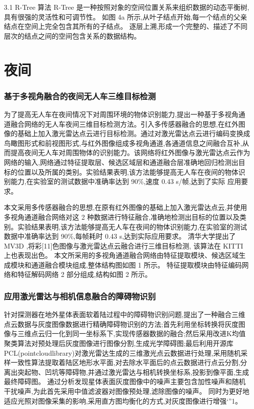 \message{ !name(\unexpanded{数据融合}.tex)}\documentclass{amsart}
\begin{document}
3.1 R-Tree 算法
R-Tree 是一种按照对象的空间位置关系来组织数据的动态平衡树,具有很强的灵活性和可调节性。
如图 4a 所示,从叶子结点开始,每一个结点的父亲结点在空间上完全包含其所有的子结点。
逐层上溯,形成一个完整的、描述了不同层次的结点之间的空间包含关系的数据结构。


\section{夜间}
\subsubsection{基于多视角融合的夜间无人车三维目标检测}
\cite{王宇岚}
为了提高无人车在夜间情况下对周围环境的物体识别能力,提出一种基于多视角通道融合网络的无人车夜间三维目标检测方法。引入多传感器融合的思想,在红外图像的基础上加入激光雷达点云进行目标检测。通过对激光雷达点云进行编码变换成鸟瞰图形式和前视图形式,与红外图像组成多视角通道,各通道信息之间融合互补,从而提高夜间无人车对周围物体的识别能力。该网络将红外图像与激光雷达点云作为网络的输入,网络通过特征提取层、候选区域层和通道融合层准确地回归检测出目标的位置以及所属的类别。实验结果表明,该方法能够提高无人车在夜间的物体识别能力,在实验室的测试数据中准确率达到 90\%,速度 0.43 s/帧,达到了实际
应用要求。


本文采用多传感器融合的思想,在原有红外图像的基础上加入激光雷达点云,并使用多视角通道融合网络对这 2 种数据进行特征融合,准确地检测出目标的位置以及类别。实验结果表明,该方法能够提高无人车在夜间的物体识别能力,在实验室的测试数据中准确率达到 90\%,每帧耗时 0.43 s,达到实际应用要求。
清华大学提出了 MV3D ,将彩[11]色图像与激光雷达点云融合进行三维目标检测,
该算法在 KITTI 上也表现出色。
本文所采用的多视角通道融合网络由特征提取模块、候选区域生成模块和通道融合模块组成,整体结构图如图 1 所示。
特征提取模块由特征编码网络和特征解码网络 2 部分组成,结构如图 2 所示。


\subsubsection{应用激光雷达与相机信息融合的障碍物识别}
针对探测器在地外星体表面软着陆过程中的障碍物识别问题,提出了一种融合三维点云数据与灰度图像数据进行精确障碍物识别的方法;首先利用坐标转换将灰度图像与三维点云归一化到同一坐标系下,实现传感器数据的融合;然后采用改进K均值聚类算法对预处理后灰度图像进行图像分割,生成光学障碍图;最后利用开源库PCL(pointcloudlibrary)对激光雷达生成的三维激光点云数据进行处理,采用随机采样一致性算法提取着陆区地形水平面,对去除水平面后的点云数据进行点云分割,分离出突起物、凹坑等障碍物,并通过激光雷达与相机转换坐标系,投影到像平面,生成最终障碍图。
通过分析发现星体表面灰度图像中的噪声主要包含加性噪声和随机干扰噪声,为此首先采用中值滤波器对图像预处理,滤除图像的噪声。
同时为更好地适应光照对图像采集的影响,采用直方图均衡化的方式,对灰度图像进行增强‘”1。
\end{document}
